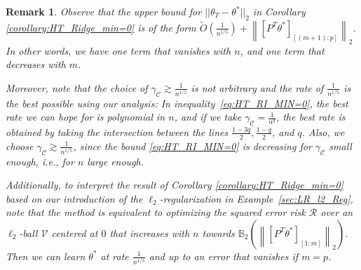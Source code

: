 \documentclass{article}
\newtheorem{remark}{\textbf{Remark}}
\begin{document}
\begin{remark}
Observe that the upper bound for $||\theta_T - \theta^*||_2$ in Corollary \ref{corollary:HT_Ridge_min=0} is of the form $\widetilde{O}\left(\frac{1}{n^{1/5}}\right) + \left\|[P^T\theta^*]_{[(m + 1):p]}\right\|_2$. In other words, we have one term that vanishes with $n$, and one term that decreases with $m$.

Moreover, note that the choice of $\gamma_{\mathcal{C}} \gtrsim \frac{1}{n^{1/5}}$ is not arbitrary and the rate of $\frac{1}{n^{1/5}}$ is the best possible using our analysis: In inequality~\eqref{eq:HT_RI_MIN=0}, the best rate we can hope for is polynomial in $n$, and if we take $\gamma_{\mathcal{C}} = \frac{1}{n^q}$, the best rate is obtained by taking the intersection between the lines $\frac{1 - 3q}{2}, \frac{1 - q}{2}$, and $q$. Also, we choose $\gamma_{\mathcal{C}} \gtrsim \frac{1}{n^{1/5}}$, since the bound \eqref{eq:HT_RI_MIN=0} is decreasing for $\gamma_{\mathcal{C}}$ small enough, i.e., for $n$ large enough.

Additionally, to interpret the result of Corollary \ref{corollary:HT_Ridge_min=0} based on our introduction of the $\ell_2$-regularization in Example~\ref{sec:LR_l2_Reg}, note that the method is equivalent to optimizing the squared error risk $\mathcal{R}$ over an $\ell_2$-ball $\mathcal{V}$ centered at $0$ that increases with $n$ towards $\mathbb{B}_2\left(\left\|[P^T\theta^*]_{[1:m]}\right\|_2\right)$.
Then we can learn $\theta^*$ at rate $\frac{1}{n^{1/5}}$ and up to an error that vanishes if $m = p$.
\end{remark}


\end{document}

